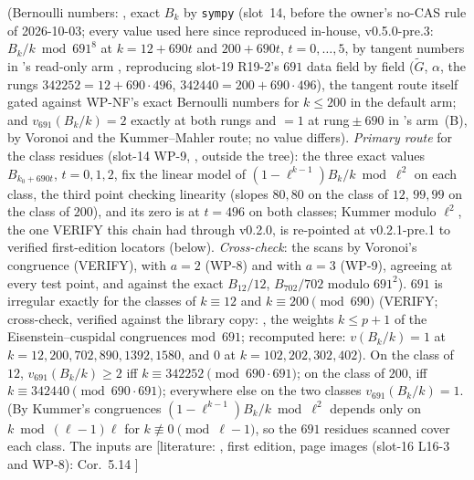 \documentclass[11pt]{article}
\newcommand{\LIT}[1]{\textsf{[literature: #1]}}   %
\newcommand{\VERIFYloc}{\textsf{VERIFY}}          %
\begin{document}
\begin{proposition}[The two irregular classes at $\ell=691$]\label{prop:u-691}
\COMP{} (Bernoulli numbers: , exact $B_k$ by \texttt{sympy} (slot~14, before the owner's no-CAS rule of 2026-10-03;
every value used here since reproduced in-house, v0.5.0-pre.3: $B_k/k\bmod691^{8}$ at $k=12+690t$ and $200+690t$, $t=0,\dots,5$, by tangent numbers in 's
read-only arm , reproducing slot-19 R19-2's $691$ data field by field ($\tilde G$, $\alpha$, the rungs $342252=12+690\cdot496$, $342440=200+690\cdot496$), the
tangent route itself gated against WP-NF's exact  Bernoulli numbers for $k\le200$ in the default arm; and $v_{691}(B_k/k)=2$ exactly at both rungs and $=1$ at
rung${}\pm690$ in 's arm~(B), by Voronoi and the Kummer--Mahler route; no value differs). \emph{Primary route} for the class residues
(slot-14 WP-9, , outside the tree): the three exact values $B_{k_0+690t}$, $t=0,1,2$, fix the
linear model of $(1-\ell^{k-1})B_k/k\bmod\ell^{2}$ on each class, the third point checking linearity (slopes $80,80$ on the class of $12$, $99,99$ on the class
of $200$), and its zero is at $t=496$ on both classes; Kummer modulo $\ell^{2}$, the one \VERIFYloc{} this chain had through v0.2.0, is re-pointed at v0.2.1-pre.1 to verified
first-edition locators (below). \emph{Cross-check}: the scans by
Voronoi's congruence \cite[Prop.~9.5]{washington} (\VERIFYloc),  with $a=2$ (WP-8) and  with $a=3$ (WP-9),
agreeing at every test point, and against the exact $B_{12}/12$, $B_{702}/702$ modulo $691^{2}$).
$691$ is irregular exactly for the classes of $k\equiv12$ and $k\equiv200\pmod{690}$ \cite{washington} (\VERIFYloc; cross-check, verified against the
library copy: \cite[Prop.~14 and the appendix table, row $p=691$, {`E [12, 200]'}]{citro_ghitza}, the weights $k\le p+1$ of the Eisenstein--cuspidal congruences mod~$691$; recomputed here: $v(B_k/k)=1$
at $k=12,200,702,890,1392,1580$, and $0$ at $k=102,202,302,402$). On the class of $12$, $v_{691}(B_k/k)\ge2$ iff $k\equiv342252\pmod{690\cdot691}$; on the class of
$200$, iff $k\equiv342440\pmod{690\cdot691}$; everywhere else on the two classes $v_{691}(B_k/k)=1$. (By Kummer's congruences
$(1-\ell^{k-1})B_k/k\bmod\ell^{2}$ depends only on $k\bmod(\ell-1)\ell$ for $k\not\equiv0\pmod{\ell-1}$, so the $691$ residues scanned cover each class.
The inputs are \LIT{\cite[Thm.~5.11, p.~57; Thm.~5.12, p.~59; Cor.~5.14, p.~61]{washington1st}, first edition, page images (slot-16 L16-3 and WP-8): Cor.~5.14
}
\end{proposition}
\end{document}
